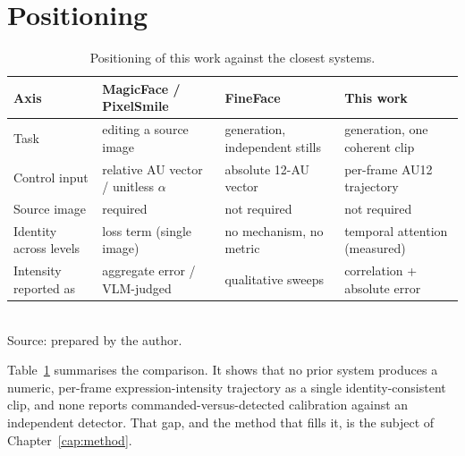 \section{Positioning}\label{sec:rw-positioning}


\begin{table}[H]
    \centering
    \caption{Positioning of this work against the closest systems.}
    \label{tab:positioning}
    \footnotesize
    \begin{tabularx}{\textwidth}{@{}l>{\raggedright\arraybackslash}X>{\raggedright\arraybackslash}X>{\raggedright\arraybackslash}X@{}}
        \toprule
        Axis & MagicFace / PixelSmile & FineFace & This work \\
        \midrule
        Task              & editing a source image      & generation, independent stills   & generation, one coherent clip \\
        Control input     & relative AU vector / unitless $\alpha$ & absolute 12-AU vector   & per-frame AU12 trajectory \\
        Source image       & required                   & not required                     & not required \\
        Identity across levels & loss term (single image) & no mechanism, no metric        & temporal attention (measured) \\
        Intensity reported as & aggregate error / VLM-judged & qualitative sweeps          & correlation + absolute error \\
        \bottomrule
    \end{tabularx}\\[4pt]
    {\footnotesize Source: prepared by the author.}
\end{table}

Table~\ref{tab:positioning} summarises the comparison. It shows that no prior system produces a numeric, per-frame expression-intensity trajectory as a single
identity-consistent clip, and none reports commanded-versus-detected calibration against an
independent detector. That gap, and the method
that fills it, is the subject of Chapter~\ref{cap:method}.
